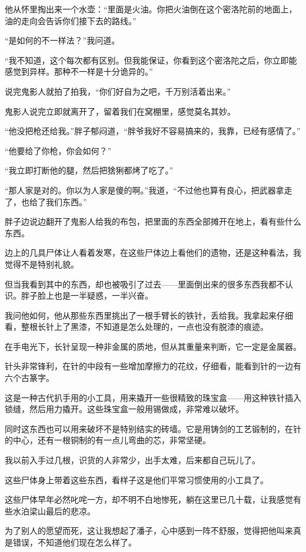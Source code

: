 他从怀里掏出来一个水壶：“里面是火油。你把火油倒在这个密洛陀前的地面上，油的走向会告诉你们接下去的路线。”

“是如何的不一样法？”我问道。

“我不知道，这个每次都有区别。但我能保证，你看到这个密洛陀之后，你立即能感觉到异样。那种不一样是十分诡异的。”

说完鬼影人就拍了拍我，“你们好自为之吧，千万别活着出来。”

鬼影人说完立即就离开了，留着我们在窝棚里，感觉莫名其妙。

“他没把枪还给我。”胖子郁闷道，“胖爷我好不容易搞来的，我靠，已经有感情了。”

“他要给了你枪，你会如何？”

“我立即打断他的腿，然后把猞猁都烤了吃了。”

“那人家是对的。你以为人家是傻的啊。”我道，“不过他也算有良心，把武器拿走了，也给了我们东西。”

胖子边说边翻开了鬼影人给我的布包，把里面的东西全部摊开在地上，看有些什么东西。

边上的几具尸体让人看着发寒，在这些尸体边上看他们的遗物，还是这种看法，我觉得不是特别礼貌。

但当我看到其中的东西，却也被吸引了过去——里面倒出来的很多东西我都不认识。胖子脸上也是一半疑惑，一半兴奋。

我问他如何，他从那些东西里挑出了一根手臂长的铁针，丢给我。我拿起来仔细看，整根长针上了黑漆，不知道是怎么处理的，一点也没有脱漆的痕迹。

在手电光下，长针呈现一种非金属的质地，但从其重量来判断，它一定是金属器。

针头非常锋利，在针的中段有一些增加摩擦力的花纹，仔细看，能看到针的一边有六个古篆字。

这是一种古代扒手用的小工具，用来撬开一些很精致的珠宝盒——用这种铁针插入锁缝，然后用力撬开。这些珠宝盒一般用锡做成，非常难以破坏。

同时这东西也可以用来破坏不是特别结实的砖墙。它是用铸剑的工艺锻制的，在针的中心，还有一根铜制的有一点儿弯曲的芯，非常坚硬。

我以前入手过几根，识货的人非常少，出手太难，后来都自己玩儿了。

这些尸体身上带着这些东西，看样子这是他们平常习惯使用的小工具了。

这些尸体早年必然叱咤一方，却不明不白地惨死，躺在这里已几十载，让我感觉有些水泊梁山最后的悲凉。

为了别人的愿望而死，这让我想起了潘子，心中感到一阵不舒服，觉得把他叫来真是错误，不知道他们现在怎么样了。


